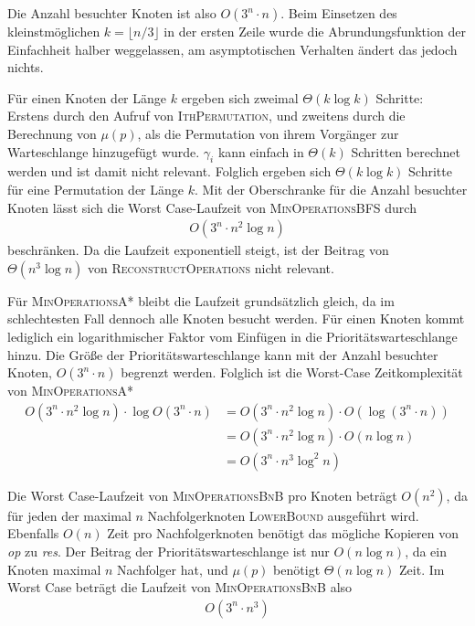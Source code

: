 \documentclass[a4paper, 11pt, ngerman]{article}
\begin{document}
Die Anzahl besuchter Knoten ist also $O(3^n \cdot n)$. Beim Einsetzen des kleinstmöglichen $k = \lfloor n/3 \rfloor$ in der ersten Zeile wurde die Abrundungsfunktion der Einfachheit halber weggelassen, am asymptotischen Verhalten ändert das jedoch nichts.

Für einen Knoten der Länge $k$ ergeben sich zweimal $\Theta(k \log k)$ Schritte: Erstens durch den Aufruf von \textsc{IthPermutation}, und zweitens durch die Berechnung von $\mu(p)$, als die Permutation von ihrem Vorgänger zur Warteschlange hinzugefügt wurde. $\gamma_i$ kann einfach in $\Theta(k)$ Schritten berechnet werden und ist damit nicht relevant. Folglich ergeben sich $\Theta(k \log k)$ Schritte für eine Permutation der Länge $k$. Mit der Oberschranke für die Anzahl besuchter Knoten lässt sich die Worst Case-Laufzeit von \textsc{MinOperationsBFS} durch
\begin{align*}
    O(3^n \cdot n^2 \log n)
\end{align*}
beschränken. Da die Laufzeit exponentiell steigt, ist der Beitrag von $\Theta(n^3 \log n)$ von \textsc{ReconstructOperations} nicht relevant.

Für \textsc{MinOperationsA*} bleibt die Laufzeit grundsätzlich gleich, da im schlechtesten Fall dennoch alle Knoten besucht werden. Für einen Knoten kommt lediglich ein logarithmischer Faktor vom Einfügen in die Prioritätswarteschlange hinzu. Die Größe der Prioritätswarteschlange kann mit der Anzahl besuchter Knoten, $O(3^n \cdot n)$ begrenzt werden. Folglich ist die Worst-Case Zeitkomplexität von \textsc{MinOperationsA*}
\begin{align*}
    O(3^n \cdot n^2 \log n) \cdot \log O(3^n \cdot n)
     & = O(3^n \cdot n^2 \log n) \cdot O(\log (3^n \cdot n)) \\
     & = O(3^n \cdot n^2 \log n) \cdot O(n \log n)           \\
     & = O(3^n \cdot n^3 \log^2 n)
\end{align*}

Die Worst Case-Laufzeit von \textsc{MinOperationsBnB} pro Knoten beträgt $O(n^2)$, da für jeden der maximal $n$ Nachfolgerknoten \textsc{LowerBound} ausgeführt wird. Ebenfalls $O(n)$ Zeit pro Nachfolgerknoten benötigt das mögliche Kopieren von \emph{op} zu \emph{res}. Der Beitrag der Prioritätswarteschlange ist nur $O(n \log n)$, da ein Knoten maximal $n$ Nachfolger hat, und $\mu(p)$ benötigt $\Theta(n \log n)$ Zeit. Im Worst Case beträgt die Laufzeit von \textsc{MinOperationsBnB} also
\begin{align*}
    O(3^n \cdot n^3)
\end{align*}
\end{document}
